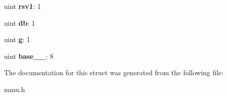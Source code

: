 \begin{DoxyCompactItemize}
\item 
uint {\bfseries rsv1}\+: 1\hypertarget{structsegdesc_a5798904f15e8fb63d2dd37e8a2818f0a}{}\label{structsegdesc_a5798904f15e8fb63d2dd37e8a2818f0a}

\item 
uint {\bfseries db}\+: 1\hypertarget{structsegdesc_a08edbd480d21bfd147e304b6f5a3788f}{}\label{structsegdesc_a08edbd480d21bfd147e304b6f5a3788f}

\item 
uint {\bfseries g}\+: 1\hypertarget{structsegdesc_a6af7593606fa1a1ff003b4a78facc8e0}{}\label{structsegdesc_a6af7593606fa1a1ff003b4a78facc8e0}

\item 
uint {\bfseries base\+\_\+\_}\+: 8\hypertarget{structsegdesc_a164a6a2e75fc62e61daef3ddab7f3169}{}\label{structsegdesc_a164a6a2e75fc62e61daef3ddab7f3169}

\end{DoxyCompactItemize}


The documentation for this struct was generated from the following file\+:\begin{DoxyCompactItemize}
\item 
mmu.\+h\end{DoxyCompactItemize}
